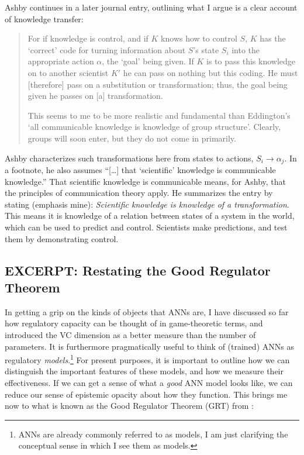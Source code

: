 \documentclass[11pt, oneside]{article}   	%
\begin{document}
Ashby continues in a later journal entry, outlining what I argue is a clear account of knowledge transfer:

\begin{quote}
For if knowledge is control, and if $K$ knows how to control $S$, $K$ has the `correct' code for turning information about $S$'s state $S_i$ into the appropriate action $\alpha$, the `goal' being given.  If $K$ is to pass this knowledge on to another scientist $K'$ he can pass on nothing but this coding.  He must [therefore] pass on a substitution or transformation; thus, the goal being given he passes on [a] transformation. 

This seems to me to be more realistic and fundamental than Eddington's `all communicable knowledge is knowledge of group structure'.  Clearly, groups will soon enter, but they do not come in primarily.  \cite[p. 4311]{AshbyJournal}
\end{quote}

Ashby characterizes such transformations here from states to actions, $S_i \rightarrow \alpha_j$.  In a footnote, he also assumes ``[\dots] that `scientific' knowledge is communicable knowledge.''  That scientific knowledge is communicable means, for Ashby, that the principles of communication theory apply.  He summarizes the entry by stating (emphasis mine):  \emph{Scientific knowledge is knowledge of a transformation}.  This means it is knowledge of a relation between states of a system in the world, which can be used to predict and control.  Scientists make predictions, and test them by demonstrating control.


\subsection{EXCERPT: Restating the Good Regulator Theorem}


In getting a grip on the kinds of objects that ANNs are, I have discussed so far how regulatory capacity can be thought of in game-theoretic terms, and introduced the VC dimension as a better measure than the number of parameters.  It is furthermore pragmatically useful to think of (trained) ANNs as regulatory \emph{models}.\footnote{ANNs are already commonly referred to as models, I am just clarifying the conceptual sense in which I see them as models.}  For present purposes, it is important to outline how we can distinguish the important features of these models, and how we measure their effectiveness. If we can get a sense of what a \emph{good} ANN model looks like, we can reduce our sense of epistemic opacity about how they function.  This brings me now to what is known as the Good Regulator Theorem (GRT) from  \citet{AshbyConant1970}:
\end{document}
